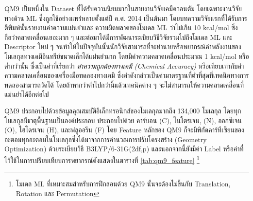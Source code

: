 QM9 เป็นหนึ่งใน Dataset ที่ได้รับความนิยมมากในสายงานวิจัยเคมีควอนตัม โดยเฉพาะงานวิจัยทางด้าน ML ซึ่งถูกใช้อย่างแพร่หลายตั้งแต่ปี ค.ศ. 
2014 เป็นต้นมา\autocite{ruddigkeit2012,ramakrishnan2014} โดยบทความวิจัยแรกที่ได้รับการตีพิมพ์นั้นรายงานค่าความแม่นยำและ%
ความผิดพลาดของโมเดล ML ว่าไม่เกิน 10 kcal/mol ซึ่งถือว่าคลาดเคลื่อนเยอะมาก ๆ และต่อมาได้มีการพัฒนาระเบียบวิธีวิจัยรวมไปถึงโมเดล ML 
และ Descriptor ใหม่ ๆ จนทำให้ในปัจจุบันนั้นนักวิจัยสามารถที่จะทำนายหรือพยากรณ์ค่าพลังงานของโมเลกุลทางเคมีอินทรีย์ขนาดเล็กได้แม่นยำมาก%
โดยมีค่าความคลาดเคลื่อนประมาณ 1 kcal/mol หรือต่ำกว่านั้น ซึ่งเป็นค่าที่เรียกว่า \textit{ค่าความถูกต้องทางเคมี (Chemical Accuracy)} 
หรือเทียบเท่ากับค่าความคลาดเคลื่อนของเครื่องมือทดลองทางเคมี ซึ่งค่าดังกล่าวเป็นค่ามาตรฐานที่ต่ำที่สุดที่เทคนิคทางการทดลองสามารถวัดได้
โดยถ้าหากว่าต่ำไปกว่านี้แล้วเทคนิคต่าง ๆ จะไม่สามารถให้ความคลาดเคลื่อนที่แม่นยำได้อีกต่อไป

QM9 ประกอบไปด้วยข้อมูลคุณสมบัติอิเล็กทรอนิกส์ของโมเลกุลมากถึง 134,000 โมเลกุล โดยทุกโมเลกุลมีธาตุพื้นฐานเป็นองค์ประกอบ ประกอบไปด้วย 
คาร์บอน (C), ไนโตรเจน, (N), ออกซิเจน (O), ไฮโดรเจน (H), และฟลูออรีน (F) โดย Feature หลักของ QM9 ก็จะมีพิกัดคาร์ทีเซียนของ%
อะตอมทุกอะตอมในโมเลกุลซึ่งได้มาจากการคำนวณการปรับโครงสร้าง (Geometry Optimization) ด้วยระเบียบวิธี B3LYP/6-31G(2df,p) 
และนอกจากนี้ยังมีค่า Label หรือค่าที่ไว้ใช้ในการเปรียบเทียบการพยากรณ์ดังแสดงในตารางที่ \ref{tab:qm9_feature}
\footnote{โมเดล ML ที่เหมาะสมสำหรับการฝึกสอนด้วย QM9 นั้นจะต้องไม่ขึ้นกับ Translation, Rotation และ Permutation}

